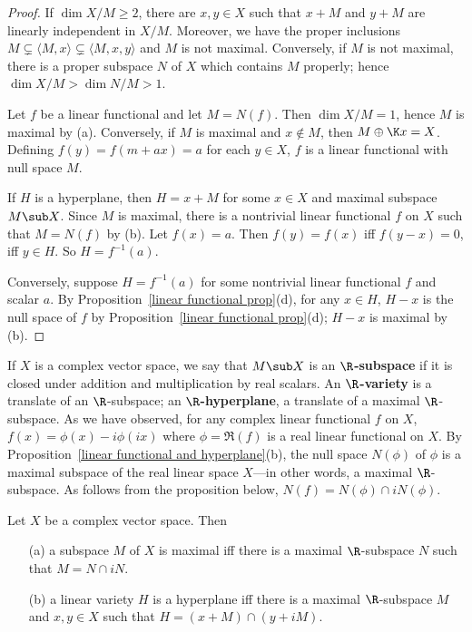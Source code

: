 \begin{proof}
If $\dim X/M\geq 2$, there are $x,y\in X$ such that $x+M$ and $y+M$ are linearly independent in $X/M$. Moreover, we have the proper inclusions $M\subsetneq\langle M,x\rangle\subsetneq\langle M,x,y\rangle$ and $M$ is not maximal. Conversely, if $M$ is not maximal, there is a proper subspace $N$ of $X$ which contains $M$ properly; hence $\dim X/M>\dim N/M>1$.\par
Let $f$ be a linear functional and let $M =N(f)$. Then $\dim X/M=1$, hence $M$ is maximal by (a). Conversely, if $M$ is maximal and $x\notin M$, then $M\oplus\K x=X$. Defining $f(y)=f(m+ax)=a$ for each $y\in X$, $f$ is a linear functional with null space $M$.\par
If $H$ is a hyperplane, then $H=x+M$ for some $x\in X$ and maximal subspace $M\sub X$. Since $M$ is maximal, there is a nontrivial linear functional $f$ on $X$ such that $M=N(f)$ by (b). Let $f(x)=a$. Then $f(y)=f(x)$ iff $f(y-x)=0$, iff $y\in H$. So $H=f^{-1}(a)$.\par
Conversely, suppose $H=f^{-1}(a)$ for some nontrivial linear functional $f$ and scalar $a$. By Proposition~\ref{linear functional prop}(d), for any $x\in H$, $H-x$ is the null space of $f$ by Proposition~\ref{linear functional prop}(d); $H-x$ is maximal by (b).
\end{proof}
If $X$ is a complex vector space, we say that $M\sub X$ is an \textbf{$\R$-subspace} if it is closed under addition and multiplication by real scalars. An \textbf{$\R$-variety} is a translate of an $\R$-subspace; an \textbf{$\R$-hyperplane}, a translate of a maximal $\R$-subspace. As we have observed, for any complex linear functional $f$ on $X$, $f(x)=\phi(x)-i\phi(ix)$ where $\phi=\Re(f)$ is a real linear functional on $X$. By Proposition~\ref{linear functional and hyperplane}(b), the null space $N(\phi)$ of $\phi$ is a maximal subspace of the real linear space $X$---in other words, a maximal $\R$-subspace. As follows from the proposition below, $N(f)=N(\phi)\cap iN(\phi)$.
\begin{proposition}\label{linear functional real and complex hyperplane}
Let $X$ be a complex vector space. Then
\begin{itemize}
\item[(a)] a subspace $M$ of $X$ is maximal iff there is a maximal $\R$-subspace $N$ such that $M=N\cap iN$.
\item[(b)] a linear variety $H$ is a hyperplane iff there is a maximal $\R$-subspace $M$ and $x,y\in X$ such that $H=(x+M)\cap(y+iM)$.
\end{itemize}
\end{proposition}
